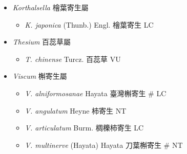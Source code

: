 
  \begin{itemize}
 \item[] \textit{Korthalsella} 檜葉寄生屬
                                
  \begin{itemize}
        \item[] \textit{K. japonica} (Thunb.) Engl.  檜葉寄生   LC
  \end{itemize}
 \item[] \textit{Thesium} 百蕊草屬
                                
  \begin{itemize}
        \item[] \textit{T. chinense} Turcz.  百蕊草   VU
  \end{itemize}
 \item[] \textit{Viscum} 槲寄生屬
                                
  \begin{itemize}
        \item[] \textit{V. alniformosanae} Hayata  臺灣槲寄生  \# LC
        \item[] \textit{V. angulatum} Heyne  柿寄生   NT
        \item[] \textit{V. articulatum} Burm.  椆櫟柿寄生   LC
        \item[] \textit{V. multinerve} (Hayata) Hayata  刀葉槲寄生  \# NT
  \end{itemize}
  \end{itemize}
